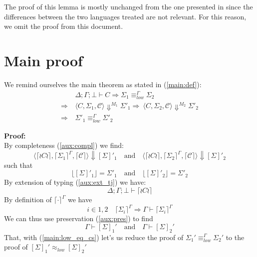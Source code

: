 \documentclass[12pt,a4paper,twoside]{book}
\begin{document}
The proof of this lemma is mostly unchanged from the one presented in \cite{myers2011proving} since the differences between the two languages treated are not relevant. For this reason, we omit the proof from this document.

\section{Main proof}
We remind ourselves the main theorem as stated in (\ref{main:def}):
\begin{align*}
	&\Delta;\Gamma;\bot \vdash C \Rightarrow
	\Sigma_1 \equiv^\Gamma_{low} \Sigma_2 \\ \Rightarrow\ &\langle C, \Sigma_1, \mathscr{C}\rangle \Downarrow^{M_1} \Sigma'_1
	\Rightarrow\ \langle C, \Sigma_2, \mathscr{C}\rangle \Downarrow^{M_2} \Sigma'_2 \\ \Rightarrow\ &\Sigma'_1 \equiv^\Gamma_{low} \Sigma'_2
\end{align*}

\noindent\textbf{Proof:}\\
By completeness (\ref{aux:compl}) we find:
$$
	\langle \lceil \wr C \wr \rceil, \lceil \Sigma_1 \rceil^\Gamma, \lceil \mathscr{C}\rceil \rangle \Downarrow [\Sigma]'_1 \quad \text{and} \quad
	\langle \lceil \wr C \wr \rceil, \lceil \Sigma_2 \rceil^\Gamma, \lceil \mathscr{C}\rceil\rangle \Downarrow [\Sigma]'_2
$$
such that
\begin{equation}\label{main:low_eq_cs}
\lfloor [\Sigma]'_1 \rfloor = \Sigma'_1 \quad \text{and} \quad
\lfloor [\Sigma]'_2 \rfloor = \Sigma'_2
\end{equation}
By extension of typing (\ref{aux:ext_tj}) we have:
$$\Delta;\Gamma;\bot \vdash \lceil \wr C \wr \rceil$$
By definition of $\lceil \cdot \rceil^\Gamma$ we have
$$
i \in {1,2} \quad \lceil \Sigma_i \rceil^\Gamma \Rightarrow
\Gamma \vdash \lceil \Sigma_i \rceil^\Gamma
$$
We can thus use preservation (\ref{aux:pres}) to find
$$
\Gamma \vdash [\Sigma]_1' \quad \text{and} \quad \Gamma \vdash [\Sigma]_2'
$$
That, with (\ref{main:low_eq_cs}) let's us reduce the proof of $
\Sigma_1' \equiv_{low}^\Gamma \Sigma_2'$ to the proof of
$ [\Sigma]_1' \approx_{low} [\Sigma]_2' $
\end{document}
